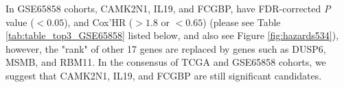 \documentclass[preprint,12pt]{elsarticle}
\newenvironment{MyColorPar}[1]{%
    \leavevmode\color{#1}\ignorespaces%
}{%
}%
\begin{document}
\begin{MyColorPar}{blue}
In GSE65858 cohorts, CAMK2N1, IL19, and FCGBP, have FDR-corrected \textit{P} value ($< 0.05$), and Cox'HR ($>1.8$ or $<0.65$) (please see Table \ref{tab:table_top3_GSE65858} listed below,
and also see Figure \ref{fig:hazards534}), however, the "rank" of other 17 genes are replaced by genes such as DUSP6, MSMB, and RBM11.
In the consensus of TCGA and GSE65858 cohorts, we suggest that CAMK2N1, IL19, and FCGBP are still significant candidates.

\begin{table}[ht]
\centering
\caption{GSE65858 and TCGA Consensus genes in Kaplan-Meier survival and Cox's model}
\label{tab:table_top3_GSE65858}
\end{table}



\end{MyColorPar}
\end{document}
